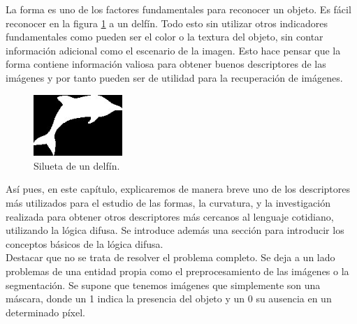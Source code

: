 La forma es uno de los factores fundamentales para reconocer un objeto. Es fácil reconocer en la figura \ref{delfin} a un delfín. Todo esto sin utilizar otros indicadores fundamentales como pueden ser el color o la textura del objeto, sin contar información adicional como el escenario de la imagen. Esto hace pensar que la forma contiene información valiosa para obtener buenos descriptores de las imágenes y por tanto pueden ser de utilidad para la recuperación de imágenes.\\


\begin{figure}[H]
\begin{center}

\includegraphics[width=0.3\textwidth]{img/delfin.jpg}
\end{center}

\caption{Silueta de un delfín.}
\label{delfin}
\end{figure}

Así pues, en este capítulo, explicaremos de manera breve uno de los descriptores más utilizados para el estudio de las formas, la curvatura, y la investigación realizada para obtener otros descriptores más cercanos al lenguaje cotidiano, utilizando la lógica difusa. Se introduce además una sección para introducir los conceptos básicos de la lógica difusa.\\

Destacar que no se trata de resolver el problema completo. Se deja a un lado problemas de una entidad propia como el preprocesamiento de las imágenes o la segmentación. Se supone que tenemos imágenes que simplemente son una máscara, donde un 1 indica la presencia del objeto y un 0 su ausencia en un determinado píxel.